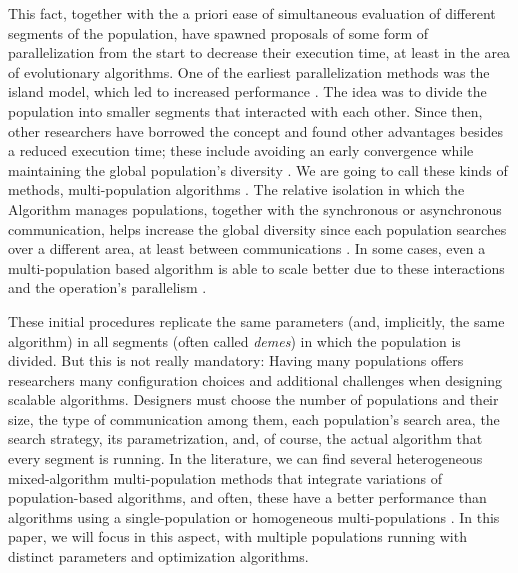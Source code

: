 \documentclass[runningheads]{llncs}
\begin{document}
This fact, together with the a priori ease of simultaneous evaluation
of different segments of the population, have spawned proposals of
some form of parallelization from the start
\cite{muhlenbein1988evolution} to decrease their execution time, at
least in the area of evolutionary algorithms. One of the earliest 
parallelization methods was the island model, which led to increased performance
\cite{gorges1990explicit,grosso1985computer}. The idea was to divide
the population into smaller segments that interacted with each
other. Since then, other researchers have borrowed the concept and found
other advantages besides a reduced execution time; these include
avoiding an early convergence while maintaining the global
population's diversity \cite{li2015multi}. We are going to call these
kinds of methods, multi-population algorithms \cite{Ma2019}. The
relative isolation in which the Algorithm manages populations,
together with the synchronous or asynchronous communication, helps
increase the global diversity since each population searches over a
different area, at least between communications
\cite{li2016multi,wu2016differential}. In some cases, even a
multi-population based algorithm is able to scale better due to these
interactions and the operation's parallelism \cite{ALBA20027}.

These initial procedures replicate the same parameters (and,
implicitly, the same algorithm) in all
segments (often called {\em demes}) in which the population is
divided. But this is not really mandatory: Having many populations
offers researchers many configuration choices and additional
challenges when designing scalable algorithms.
Designers must choose the number of populations and their size, the type of
communication among them, each population's search area, the search
strategy, its parametrization, and, of course, the actual algorithm
that every segment is running. In the literature, we can find several
heterogeneous mixed-algorithm multi-population methods that integrate
variations of population-based algorithms, and often, these have a better performance
than  algorithms using a single-population or homogeneous multi-populations 
\cite{wu2016differential,nseef2016adaptive}. In this paper,
we will focus in this aspect, with multiple populations running with
distinct parameters and optimization algorithms.
\end{document}
